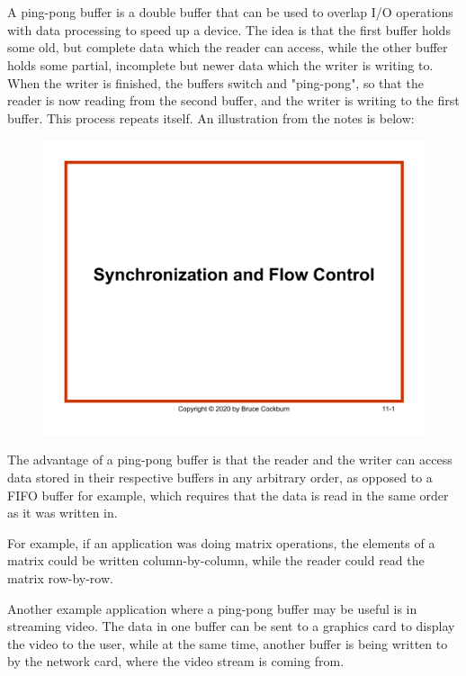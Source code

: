 \section{}

A ping-pong buffer is a double buffer that can be used to overlap I/O operations
with data processing to speed up a device.  The idea is that the first buffer
holds some old, but complete data which the reader can access, while the other
buffer holds some partial, incomplete but newer data which the writer is writing
to. When the writer is finished, the buffers switch and "ping-pong", so that the
reader is now reading from the second buffer, and the writer is writing to the
first buffer. This process repeats itself.
An illustration from the notes is below:

\begin{figure}[h]
  \includegraphics[page=17, width=\textwidth]{../../notes/Ch11_W20_Flow_Control.pdf}
\end{figure}

  The advantage of a ping-pong buffer is that the reader and the writer can
  access data stored in their respective buffers in any arbitrary order,
  as opposed to a FIFO buffer for example, which requires that the data is read
  in the same order as it was written in. 

  For example, if an application was doing matrix operations, the elements of a
  matrix could be written column-by-column, while the reader could read the
  matrix row-by-row.

  Another example application where a ping-pong buffer may be useful is in
  streaming video. The data in one buffer can be sent to a graphics card to
  display the video to the user, while at the same time, another buffer is being
  written to by the network card, where the video stream is coming from.
